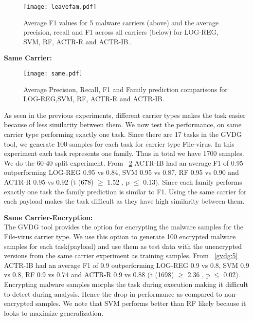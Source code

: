 \documentclass[conference]{IEEEtran}
\begin{document}
\begin{figure}[htb!]
	\centerline{\texttt{[image: leavefam.pdf]}}
	\vspace{0em}
	\caption{\textmd{Average F1 values for 5 malware carriers (above) and the average precision, recall and F1 across all carriers (below) for LOG-REG, SVM, RF, ACTR-R and ACTR-IB..}}

	\label{gvdg:3}
\end{figure}

\noindent
{\bf Same Carrier:}\\
\vspace{-1em}
\begin{figure}[htb!]
	\centerline{\texttt{[image: same.pdf]}}
	\vspace{0em}
	\caption{\textmd{Average Precision, Recall, F1 and Family prediction comparisons for LOG-REG,SVM, RF, ACTR-R and ACTR-IB.}}
	\vspace{-2em}
	\label{gvdg:4}
\end{figure}

As seen in the previous experiments, different carrier types makes the task easier because of less similarity between them. We now test the performance, on same carrier type performing exactly one task. Since there are 17 tasks in the GVDG tool, we generate 100 samples for each task for carrier type File-virus. In this experiment each task represents one family. Thus in total we have 1700 samples. We do the 60-40 split experiment. From \figurename~\ref{gvdg:4}  ACTR-IB had an average F1 of 0.95 outperforming LOG-REG 0.95 vs 0.84, SVM 0.95 vs 0.87, RF 0.95 vs 0.90 and ACTR-R 0.95 vs 0.92 (t (678) $\geq$ 1.52 , p $\leq$ 0.13). Since each family performs exactly one task the family prediction is similar to F1. Using the same carrier for each payload makes the task difficult as they have high similarity between them. 

\noindent
{\bf Same Carrier-Encryption:}\\	
The GVDG tool provides the option for encrypting the malware samples for the File-virus carrier type. We use this option to generate 100 encrypted malware samples for each task(payload) and use them as test data with the unencrypted versions from the same carrier experiment as training samples. From \figurename~\ref{gvdg:5} ACTR-IB had an average F1 of 0.9 outperforming LOG-REG 0.9 vs 0.8, SVM 0.9 vs 0.8, RF 0.9 vs 0.74 and ACTR-R 0.9 vs 0.88 (t (1698) $\geq$ 2.36  , p $\leq$ 0.02). Encrypting malware samples morphs the task during execution making it difficult to detect during analysis. Hence the drop in performance as compared to non-encrypted samples. We note that SVM performs better than RF  likely because it looks to maximize generalization.\\
\end{document}
